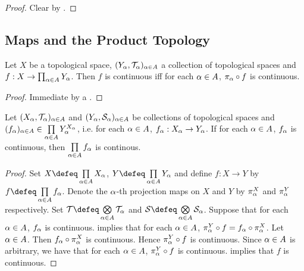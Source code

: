 \documentclass{book}
\begin{document}
	\begin{proof} 
		Clear by .
	\end{proof}




















	
	
	
	
	
	
	
	
	\subsection{Maps and the Product Topology}
	
	\begin{ex}  
		Let $X$ be a topological space, $(Y_{\alpha}, \mathcal{T}_{\alpha})_{\alpha \in A}$ a collection of topological spaces and $f: X \rightarrow \prod_{\alpha \in A}Y_{\alpha}$. Then $f$ is continuous iff for each $\alpha \in A$, $\pi_{\alpha} \circ f$ is continuous.
	\end{ex}

	\begin{proof}
		Immediate by a .
	\end{proof}
	
	\begin{ex} 
		Let $(X_{\alpha}, \mathcal{T}_{\alpha})_{\alpha \in A}$ and $(Y_{\alpha}, \mathcal{S}_{\alpha})_{\alpha \in A}$ be collections of topological spaces and $(f_{\alpha})_{\alpha \in A} \in \prod\limits_{\alpha \in A} Y_{\alpha}^{X_{\alpha}}$, i.e. for each $\alpha \in A$, $f_{\alpha}:X_{\alpha} \rightarrow Y_{\alpha}$. If for each $\alpha \in A$, $f_{\alpha}$ is continuous, then $\prod\limits_{\alpha \in A} f_{\alpha}$ is continous.
	\end{ex}

	\begin{proof}
		Set $X \defeq \prod\limits_{\al \in A} X_{\al}$, $Y \defeq \prod\limits_{\al \in A}Y_{\al}$ and define $f: X \rightarrow Y$ by $f \defeq \prod\limits_{\al \in A} f_{\al}$. Denote the $\alpha$-th projection maps on $X$ and $Y$ by $\pi^X_{\alpha}$ and $\pi^Y_{\alpha}$ respectively. Set $\MT \defeq \bigotimes\limits_{\al \in A}\MT_{\al}$ and $\MS \defeq \bigotimes\limits_{\al \in A} \MS_{\al}$. Suppose that for each $\alpha \in A$, $f_{\alpha}$ is continuous.  implies that for each $\alpha \in A$, $\pi^Y_{\alpha} \circ f = f_{\alpha} \circ \pi^X_{\alpha}$. Let $\alpha \in A$. Then $f_{\alpha} \circ \pi^X_{\alpha}$ is continuous. Hence $\pi^Y_{\alpha} \circ f$ is continuous. Since $\alpha \in A$ is arbitrary, we have that for each $\alpha \in A$, $\pi^Y_{\alpha} \circ f$ is continuous.  implies that $f$ is continuous. 
	\end{proof}
\end{document}
